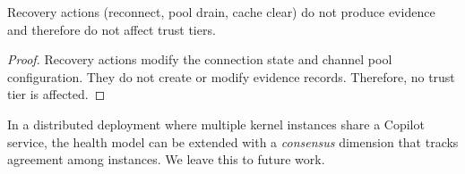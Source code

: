 \documentclass[11pt]{article}
\begin{document}
\begin{lemma}%
\label{lem:recovnotrust}
Recovery actions (reconnect, pool drain, cache clear) do not
produce evidence and therefore do not affect trust tiers.
\end{lemma}
\begin{proof}
Recovery actions modify the connection state and channel
pool configuration.  They do not create or modify evidence
records.  Therefore, no trust tier is affected.
\end{proof}

\begin{remark}
In a distributed deployment where multiple kernel instances
share a Copilot service, the health model can be extended
with a \emph{consensus} dimension that tracks agreement
among instances.  We leave this to future work.
\end{remark}
\end{document}
